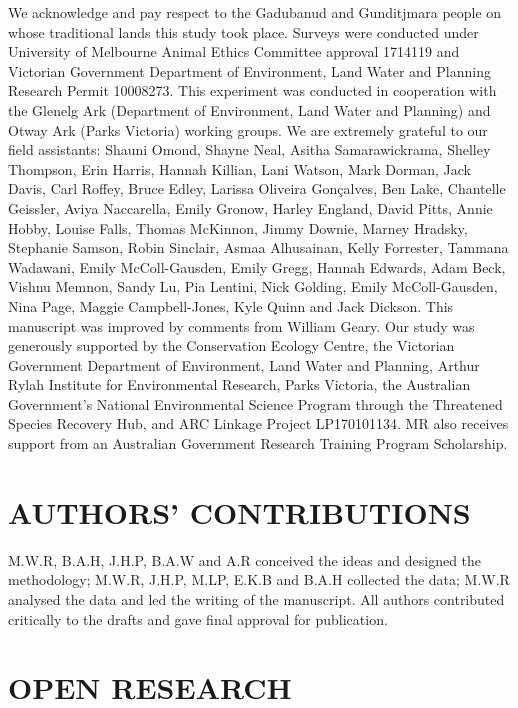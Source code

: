 \documentclass[]{elsarticle} %
\begin{document}
We acknowledge and pay respect to the Gadubanud and Gunditjmara people on whose traditional lands this study took place. Surveys were conducted under University of Melbourne Animal Ethics Committee approval 1714119 and Victorian Government Department of Environment, Land Water and Planning Research Permit 10008273. This experiment was conducted in cooperation with the Glenelg Ark (Department of Environment, Land Water and Planning) and Otway Ark (Parks Victoria) working groups. We are extremely grateful to our field assistants: Shauni Omond, Shayne Neal, Asitha Samarawickrama, Shelley Thompson, Erin Harris, Hannah Killian, Lani Watson, Mark Dorman, Jack Davis, Carl Roffey, Bruce Edley, Larissa Oliveira Gonçalves, Ben Lake, Chantelle Geissler, Aviya Naccarella, Emily Gronow, Harley England, David Pitts, Annie Hobby, Louise Falls, Thomas McKinnon, Jimmy Downie, Marney Hradsky, Stephanie Samson, Robin Sinclair, Asmaa Alhusainan, Kelly Forrester, Tammana Wadawani, Emily McColl-Gausden, Emily Gregg, Hannah Edwards, Adam Beck, Vishnu Memnon, Sandy Lu, Pia Lentini, Nick Golding, Emily McColl-Gausden, Nina Page, Maggie Campbell-Jones, Kyle Quinn and Jack Dickson. This manuscript was improved by comments from William Geary. Our study was generously supported by the Conservation Ecology Centre, the Victorian Government Department of Environment, Land Water and Planning, Arthur Rylah Institute for Environmental Research, Parks Victoria, the Australian Government's National Environmental Science Program through the Threatened Species Recovery Hub, and ARC Linkage Project LP170101134. MR also receives support from an Australian Government Research Training Program Scholarship.

\hypertarget{authors-contributions}{%
\section{AUTHORS' CONTRIBUTIONS}\label{authors-contributions}}

M.W.R, B.A.H, J.H.P, B.A.W and A.R conceived the ideas and designed the methodology; M.W.R, J.H.P, M.LP, E.K.B and B.A.H collected the data; M.W.R analysed the data and led the writing of the manuscript. All authors contributed critically to the drafts and gave final approval for publication.

\hypertarget{open-research}{%
\section{OPEN RESEARCH}\label{open-research}}
\end{document}
